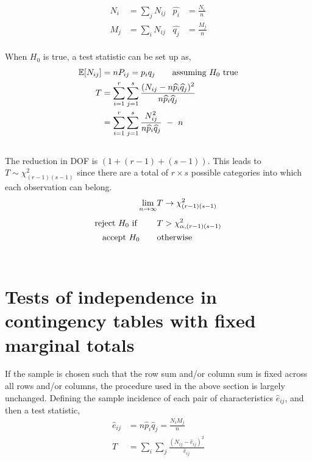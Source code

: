 \begin{align}
	N_i &= \sum_j N_{ij} & \widehat{p_i} &= \frac{N_i}{n} \\
	M_j &= \sum_i N_{ij} & \widehat{q_j} &= \frac{M_j}{n}
\end{align}\\

When $ H_0 $ is true, a test statistic can be set up as,\\

\begin{align}
	\mathbb{E}[N_{ij}] &= nP_{ij} = p_i q_j \qquad \text{assuming $ H_0 $ true} \\
	T &= \sum\limits_{i=1}^{r} \sum\limits_{j=1}^{s} \frac{\displaystyle (N_{ij} - n\widehat{p}_i \widehat{q}_j)^2}{\displaystyle n\widehat{p}_i \widehat{q}_j} \nonumber \\
	&= \sum\limits_{i=1}^{r} \sum\limits_{j=1}^{s} \frac{\displaystyle N_{ij}^2}{\displaystyle n\widehat{p}_i \widehat{q}_j}\ -\ n
\end{align}\\

The reduction in DOF is $ (1 + (r-1) + (s-1)) $. This leads to $ T \sim \chi^2_{(r-1)(s-1)} $ since there are a total of $ r \times s $ possible categories into which each observation can belong.\\

\begin{align}
	\lim\limits_{n \to \infty} & T \to \chi^2_{(r-1)(s-1)} \\[1ex]
	\text{reject $ H_0 $ if } \qquad & T > \chi^2_{\alpha, (r-1)(s-1)}  \nonumber \\
	\text{accept $ H_0 $} \qquad & \text{otherwise}
\end{align}\\

\section{Tests of independence in contingency tables with fixed marginal totals}

If the sample is chosen such that the row sum and/or column sum is fixed across all rows and/or columns, the procedure used in the above section is largely unchanged. Defining the sample incidence of each pair of characteristics $ \widehat{e}_{ij} $, and then a test statistic, \\

\begin{align}
	\widehat{e}_{ij} &= n\widehat{p}_i \widehat{q}_j = \frac{N_i M_j}{n} \\
	T &= \sum_{i} \sum_{j} \frac{(N_{ij} - \widehat{e}_{ij})^2}{\widehat{e}_{ij}}
\end{align}\\


